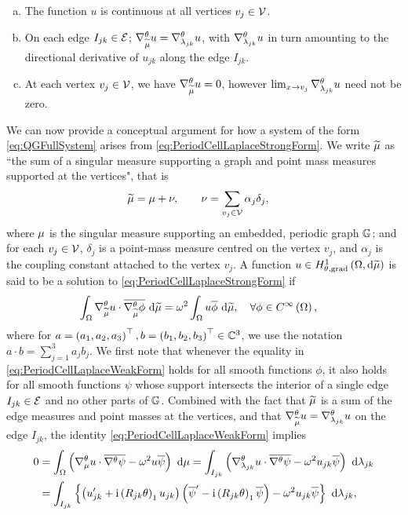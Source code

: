 \begin{enumerate}[(a)]
	\item The function $u$ is continuous at all vertices $v_j\in\mathcal{V}$.
	\item On each edge $I_{jk}\in\mathcal{E}$; $\nabla^{\theta}_{\widetilde{\mu}}u = \nabla^{\theta}_{\lambda_{jk}}u$, with $\nabla^{\theta}_{\lambda_{jk}}u$ in turn amounting to the directional derivative of $u_{jk}$ along the edge $I_{jk}$.
	\item At each vertex $v_j\in\mathcal{V}$, we have $\nabla^{\theta}_{\widetilde{\mu}}u=0$, however $\lim_{x\rightarrow v_j}\nabla^{\theta}_{\lambda_{jk}}u$ need not be zero.
\end{enumerate}

We can now provide a conceptual argument for how a system of the form \eqref{eq:QGFullSystem} arises from \eqref{eq:PeriodCellLaplaceStrongForm}.
We write $\widetilde{\mu}$ as ``the sum of a singular measure supporting a graph and point mass measures supported at the vertices", that is
\begin{align*}
	\widetilde{\mu} &= \mu + \nu, \qquad
	\nu = \sum_{v_j\in\mathcal{V}}\alpha_j \delta_j,
\end{align*}
where $\mu$ is the singular measure supporting an embedded, periodic graph $\mathbb{G}$; and for each $v_j\in\mathcal{V}$, $\delta_j$ is a point-mass measure centred on the vertex $v_j$, and $\alpha_j$ is the coupling constant attached to the vertex $v_j$.
A function $u\in H^1_{\theta, \mathrm{grad}}\left( \Omega, \mathrm{d}\widetilde{\mu} \right)$ is said to be a solution to \eqref{eq:PeriodCellLaplaceStrongForm} if
\begin{align} \label{eq:PeriodCellLaplaceWeakForm}
	\int_{\Omega}\nabla^{\theta}_{\widetilde{\mu}}u\cdot\overline{\nabla^{\theta}_{\widetilde{\mu}}\phi} \ \mathrm{d}\widetilde{\mu} &= \omega^2\int_{\Omega}u\overline{\phi} \ \mathrm{d}\widetilde{\mu}, \quad\forall \phi\in C^{\infty}\left( \Omega \right),
\end{align}
where for $a=\left( a_1,a_2,a_3 \right)^\top, b=\left( b_1,b_2,b_3 \right)^\top\in\mathbb{C}^3$, we use the notation $a\cdot b = \sum_{j=1}^{3}a_j b_j$.
We first note that whenever the equality in \eqref{eq:PeriodCellLaplaceWeakForm} holds for all smooth functions $\phi$, it also holds for all smooth functions $\psi$ whose support intersects the interior of a single edge $I_{jk}\in\mathcal{E}$ and no other parts of $\mathbb{G}$.
Combined with the fact that $\widetilde{\mu}$ is a sum of the edge measures and point masses at the vertices, and that $\nabla^{\theta}_{\widetilde{\mu}}u=\nabla^{\theta}_{\lambda_{jk}}u$ on the edge $I_{jk}$, the identity \eqref{eq:PeriodCellLaplaceWeakForm} implies
\begin{align*}
	0 &= \int_{\Omega} \left( \nabla^{\theta}_\mu u \cdot \overline{\nabla^{\theta}\psi} - \omega^2 u\overline{\psi} \right)  \ \mathrm{d}\mu
	= \int_{I_{jk}} \left( \nabla^{\theta}_{\lambda_{jk}}u \cdot \overline{\nabla^{\theta}\psi} - \omega^2 u_{jk}\overline{\psi} \right)  \ \mathrm{d}\lambda_{jk} \\
	&= \int_{I_{jk}} \left\{  \left( u_{jk}' + \mathrm{i}\left( R_{jk}\theta \right)_1 u_{jk} \right)\left( \overline{\psi}' - \mathrm{i}\left( R_{jk}\theta \right)_1 \overline{\psi}  \right) - \omega^2 u_{jk}\overline{\psi}  \right\}  \ \mathrm{d}\lambda_{jk},
\end{align*}
